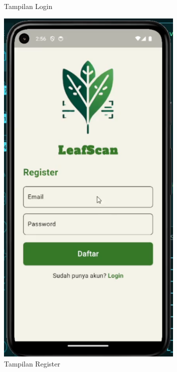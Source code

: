 \documentclass[journal,article,submit,pdftex,moreauthors]{Definitions/mdpi}
\begin{document}
\begin{itemize}
\begin{itemize}
\begin{figure}[H]
\begin{minipage}{0.3\textwidth}
                \caption{\centering Tampilan Login}
                \label{fig:login-view}
            \end{minipage}
            \hfill
            \begin{minipage}{0.3\textwidth}
                \centering
                \includegraphics[width=0.8\textwidth]{Images/register_view.png}
                \caption{\centering Tampilan Register}
                \label{fig:register-view}
            \end{minipage}
            \hfill
            \begin{minipage}{0.3\textwidth}
                \centering

\end{minipage}
\end{figure}
\end{itemize}
\end{itemize}
\end{document}
